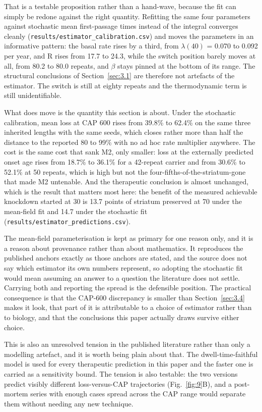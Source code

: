 \documentclass[conference]{IEEEtran}
\begin{document}
That is a testable proposition rather than a hand-wave, because the fit can simply be redone against the right quantity. Refitting the same four parameters against stochastic mean first-passage times instead of the integral converges cleanly (\texttt{results/\allowbreak{}estimator\_\allowbreak{}calibration.\allowbreak{}csv}) and moves the parameters in an informative pattern: the basal rate rises by a third, from $\lambda(40)$ = 0.070 to 0.092 per year, and R rises from 17.7 to 24.3, while the switch position barely moves at all, from 80.2 to 80.0 repeats, and $\beta$ stays pinned at the bottom of its range. The structural conclusions of Section~\ref{sec:3.1} are therefore not artefacts of the estimator. The switch is still at eighty repeats and the thermodynamic term is still unidentifiable.

What does move is the quantity this section is about. Under the stochastic calibration, mean loss at CAP 600 rises from 39.8\% to 62.4\% on the same three inherited lengths with the same seeds, which closes rather more than half the distance to the reported 80 to 99\% with no ad hoc rate multiplier anywhere. The cost is the same cost that sank M2, only smaller: loss at the externally predicted onset age rises from 18.7\% to 36.1\% for a 42-repeat carrier and from 30.6\% to 52.1\% at 50 repeats, which is high but not the four-fifths-of-the-striatum-gone that made M2 untenable. And the therapeutic conclusion is almost unchanged, which is the result that matters most here: the benefit of the measured achievable knockdown started at 30 is 13.7 points of striatum preserved at 70 under the mean-field fit and 14.7 under the stochastic fit (\texttt{results/\allowbreak{}estimator\_\allowbreak{}predictions.\allowbreak{}csv}).

The mean-field parameterisation is kept as primary for one reason only, and it is a reason about provenance rather than about mathematics. It reproduces the published anchors exactly as those anchors are stated, and the source does not say which estimator its own numbers represent, so adopting the stochastic fit would mean assuming an answer to a question the literature does not settle. Carrying both and reporting the spread is the defensible position. The practical consequence is that the CAP-600 discrepancy is smaller than Section~\ref{sec:3.4} makes it look, that part of it is attributable to a choice of estimator rather than to biology, and that the conclusions this paper actually draws survive either choice.

This is also an unresolved tension in the published literature rather than only a modelling artefact, and it is worth being plain about that. The dwell-time-faithful model is used for every therapeutic prediction in this paper and the faster one is carried as a sensitivity bound. The tension is also testable: the two versions predict visibly different loss-versus-CAP trajectories (Fig.~\ref{fig:9}B), and a post-mortem series with enough cases spread across the CAP range would separate them without needing any new technique.
\end{document}
